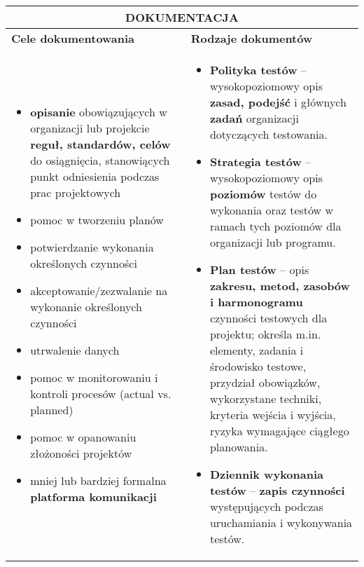 \documentclass[../main.tex]{subfiles}
\begin{document}
    \begin{table}[H]
        \begin{center}
            \begin{tabular}{| p{8cm} | p{8cm} |}
                \hline
                \multicolumn{2}{|c|}{\textbf{DOKUMENTACJA}} \\
                \hline
                \hline
                \textbf{Cele dokumentowania} & \textbf{Rodzaje dokumentów} \\
                \hline
                \begin{itemize}
                    \item \textbf{opisanie} obowiązujących w organizacji lub projekcie \textbf{reguł, standardów, celów} do osiągnięcia, stanowiących punkt odniesienia podczas prac projektowych
                    \item pomoc w tworzeniu planów
                    \item potwierdzanie wykonania określonych czynności
                    \item akceptowanie/zezwalanie na wykonanie określonych czynności
                    \item utrwalenie danych
                    \item pomoc w monitorowaniu i kontroli procesów (actual vs. planned)
                    \item pomoc w opanowaniu złożoności projektów
                    \item mniej lub bardziej formalna \textbf{platforma komunikacji}
                \end{itemize}
                &
                \begin{itemize}
                    \item \textbf{Polityka testów} – wysokopoziomowy opis \textbf{zasad, podejść} i głównych \textbf{zadań} organizacji dotyczących testowania.
                    \item \textbf{Strategia testów} – wysokopoziomowy opis \textbf{poziomów} testów do wykonania oraz testów w ramach tych poziomów dla organizacji lub programu.
                    \item \textbf{Plan testów} – opis \textbf{zakresu, metod, zasobów i harmonogramu} czynności testowych dla projektu; określa m.in. elementy, zadania i środowisko testowe, przydział obowiązków, wykorzystane techniki, kryteria wejścia i wyjścia, ryzyka wymagające ciągłego planowania.
                    \item \textbf{Dziennik wykonania testów} – \textbf{zapis czynności} występujących podczas uruchamiania i wykonywania testów.
                \end{itemize} \\
                \hline
            \end{tabular}
        \end{center}
    \end{table}
\end{document}
